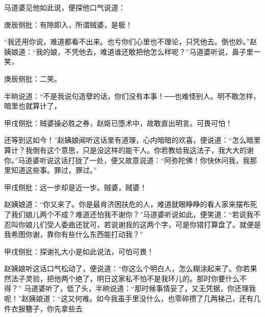 \begin{parag}
    马道婆见他如此说，便探他口气说道：\begin{note}庚辰侧批：有隙即入，所谓贼婆，是极！\end{note}“我还用你说，难道都看不出来。也亏你们心里也不理论，只凭他去。倒也妙。”赵姨娘道：“我的娘，不凭他去，难道谁还敢把他怎么样呢？”马道婆听说，鼻子里一笑，\begin{note}庚辰侧批：二笑。\end{note}半晌说道：“不是我说句造孽的话，你们没有本事！──也难怪别人。明不敢怎样，暗里也就算计了，\begin{note}甲戌侧批：贼婆操必胜之券，赵妪已堕术中，故敢直出明言。可畏可怕！\end{note}还等到这如今！”赵姨娘闻听这话里有道理，心内暗暗的欢喜，便说道：“怎么暗里算计？我倒有这个意思，只是没这样的能干人。你若教给我这法子，我大大的谢你。”马道婆听说这话打拢了一处，便又故意说道：“阿弥陀佛！你快休问我，我那里知道这些事。罪过，罪过。”\begin{note}甲戌侧批：远一步却是近一步。贼婆，贼婆！\end{note}赵姨娘道：“你又来了。你是最肯济困扶危的人，难道就眼睁睁的看人家来摆布死了我们娘儿两个不成？难道还怕我不谢你？”马道婆听说如此，便笑道：“若说我不忍叫你娘儿们受人委曲还犹可，若说谢我的这两个字，可是你错打算盘了。就便是我希图你谢，靠你有些什么东西能打动我？”\begin{note}甲戌侧批：探谢礼大小是如此说法，可怕可畏！\end{note}赵姨娘听这话口气松动了，便说道：“你这么个明白人，怎么糊涂起来了。你若果然法子灵验，把他两个绝了，明日这家私不怕不是我环儿的。那时你要什么不得？” 马道婆听了，低了头，半晌说道：“那时候事情妥了，又无凭据，你还理我呢！”赵姨娘道：“这又何难。如今我虽手里没什么，也零碎攒了几两梯己，还有几件衣服簪子，你先拿些去
\end{parag}

